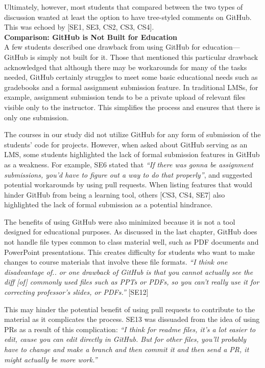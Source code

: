 Ultimately, however, most students that compared between the two types of discussion wanted at least the option to have tree-styled comments on GitHub. This was echoed by [SE1, SE3, CS2, CS3, CS4]. \\

\textbf{Comparison: GitHub is Not Built for Education} \\
A few students described one drawback from using GitHub for education---GitHub is simply not built for it. Those that mentioned this particular drawback acknowledged that although there may be workarounds for many of the tasks needed, GitHub certainly struggles to meet some basic educational needs such as gradebooks and a formal assignment submission feature. In traditional LMSs, for example, assignment submission tends to be a private upload of relevant files visible only to the instructor. This simplifies the process and ensures that there is only one submission.

The courses in our study did not utilize GitHub for any form of submission of the students' code for projects. However, when asked about GitHub serving as an LMS, some students highlighted the lack of formal submission features in GitHub as a weakness. For example, SE6 stated that \textit{``If there was gonna be assignment submissions, you'd have to figure out a way to do that properly''}, and suggested potential workarounds by using pull requests. When listing features that would hinder GitHub from being a learning tool, others [CS3, CS4, SE7] also highlighted the lack of formal submission as a potential hindrance.

The benefits of using GitHub were also minimized because it is not a tool designed for educational purposes. As discussed in the last chapter, GitHub does not handle file types common to class material well, such as PDF documents and PowerPoint presentations. This creates difficulty for students who want to make changes to course materials that involve these file formats. \textit{``I think one disadvantage of.. or one drawback of GitHub is that you cannot actually see the diff [of] commonly used files such as PPTs or PDFs, so you can't really use it for correcting professor's slides, or PDFs.''} [SE12]

This may hinder the potential benefit of using pull requests to contribute to the material as it complicates the process. SE13 was dissuaded from the idea of using PRs as a result of this complication: \textit{``I think for readme files, it's a lot easier to edit, cause you can edit directly in GitHub. But for other files, you'll probably have to change and make a branch and then commit it and then send a PR, it might actually be more work.''}

